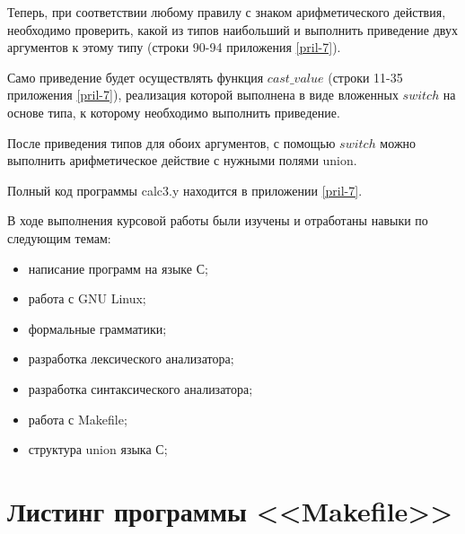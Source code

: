 \documentclass[bachelor, och, coursework, times]{SCWorks}
\begin{document}
Теперь, при соответствии любому правилу с знаком арифметического действия, необходимо проверить, какой из типов наибольший и выполнить приведение двух аргументов к этому типу (строки 90-94 приложения \ref{pril-7}).

Само приведение будет осуществлять функция $cast\_value$ (строки 11-35 приложения \ref{pril-7}), реализация которой выполнена в виде вложенных $switch$ на основе типа, к которому необходимо выполнить приведение.

После приведения типов для обоих аргументов, с помощью $switch$ можно выполнить арифметическое действие с нужными полями union.

Полный код программы calc3.y находится в приложении \ref{pril-7}.
















\conclusion
В ходе выполнения курсовой работы были изучены и отработаны навыки по следующим темам:
\begin{itemize}
	\item написание программ на языке С;
	\item работа с GNU Linux;
	\item формальные грамматики;
	\item разработка лексического анализатора;
	\item разработка синтаксического анализатора;
	\item работа с Makefile;
	\item структура union языка С;
\end{itemize}


%

%



\appendix

\section{Листинг программы <<Makefile>>}\label{pril-1}
\end{document}
